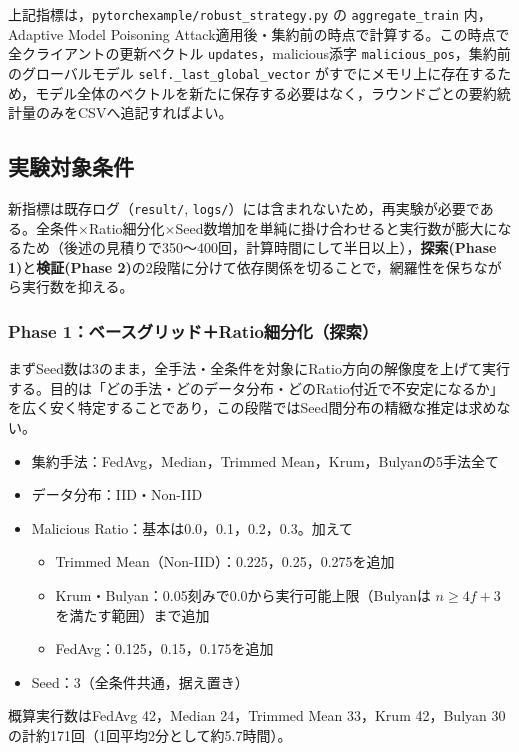 \documentclass[a4j, twocolumn, dvipdfmx]{jsarticle}  %
\begin{document}
上記指標は，\texttt{pytorchexample/robust\_strategy.py} の \texttt{aggregate\_train} 内，Adaptive Model Poisoning Attack適用後・集約前の時点で計算する。この時点で全クライアントの更新ベクトル \texttt{updates}，malicious添字 \texttt{malicious\_pos}，集約前のグローバルモデル \texttt{self.\_last\_global\_vector} がすでにメモリ上に存在するため，モデル全体のベクトルを新たに保存する必要はなく，ラウンドごとの要約統計量のみをCSVへ追記すればよい。

\subsection{実験対象条件}

新指標は既存ログ（\texttt{result/}, \texttt{logs/}）には含まれないため，再実験が必要である。全条件×Ratio細分化×Seed数増加を単純に掛け合わせると実行数が膨大になるため（後述の見積りで350〜400回，計算時間にして半日以上），\textbf{探索(Phase 1)}と\textbf{検証(Phase 2)}の2段階に分けて依存関係を切ることで，網羅性を保ちながら実行数を抑える。

\subsubsection{Phase 1：ベースグリッド＋Ratio細分化（探索）}

まずSeed数は3のまま，全手法・全条件を対象にRatio方向の解像度を上げて実行する。目的は「どの手法・どのデータ分布・どのRatio付近で不安定になるか」を広く安く特定することであり，この段階ではSeed間分布の精緻な推定は求めない。

\begin{itemize}
  \item 集約手法：FedAvg，Median，Trimmed Mean，Krum，Bulyanの5手法全て
  \item データ分布：IID・Non-IID
  \item Malicious Ratio：基本は0.0，0.1，0.2，0.3。加えて
    \begin{itemize}
      \item Trimmed Mean（Non-IID）：0.225，0.25，0.275を追加
      \item Krum・Bulyan：0.05刻みで0.0から実行可能上限（Bulyanは $n \geq 4f+3$ を満たす範囲）まで追加
      \item FedAvg：0.125，0.15，0.175を追加
    \end{itemize}
  \item Seed：3（全条件共通，据え置き）
\end{itemize}

概算実行数はFedAvg 42，Median 24，Trimmed Mean 33，Krum 42，Bulyan 30の計約171回（1回平均2分として約5.7時間）。
\end{document}
